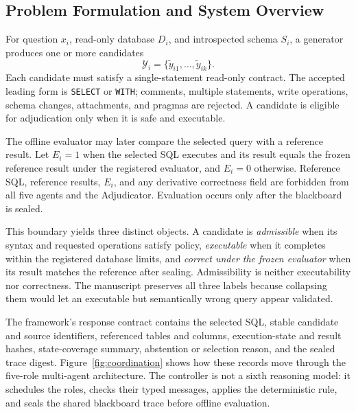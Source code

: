 \documentclass[applsci,article,submit,moreauthors]{Definitions/mdpi}
\begin{document}
\subsection{Problem Formulation and System Overview}

For question $x_i$, read-only database $D_i$, and introspected schema $S_i$, a generator produces one or more candidates
\begin{equation}
\mathcal{Y}_i=\{\widetilde{y}_{i1},\ldots,\widetilde{y}_{ik}\}.
\end{equation}
Each candidate must satisfy a single-statement read-only contract. The accepted leading form is \texttt{SELECT} or \texttt{WITH}; comments, multiple statements, write operations, schema changes, attachments, and pragmas are rejected. A candidate is eligible for adjudication only when it is safe and executable.

The offline evaluator may later compare the selected query with a reference result. Let $E_i=1$ when the selected SQL executes and its result equals the frozen reference result under the registered evaluator, and $E_i=0$ otherwise. Reference SQL, reference results, $E_i$, and any derivative correctness field are forbidden from all five agents and the Adjudicator. Evaluation occurs only after the blackboard is sealed.

This boundary yields three distinct objects. A candidate is \emph{admissible} when its syntax and requested operations satisfy policy, \emph{executable} when it completes within the registered database limits, and \emph{correct under the frozen evaluator} when its result matches the reference after sealing. Admissibility is neither executability nor correctness. The manuscript preserves all three labels because collapsing them would let an executable but semantically wrong query appear validated.

The framework's response contract contains the selected SQL, stable candidate and source identifiers, referenced tables and columns, execution-state and result hashes, state-coverage summary, abstention or selection reason, and the sealed trace digest. Figure~\ref{fig:coordination} shows how these records move through the five-role multi-agent architecture. The controller is not a sixth reasoning model: it schedules the roles, checks their typed messages, applies the deterministic rule, and seals the shared blackboard trace before offline evaluation.
\end{document}
